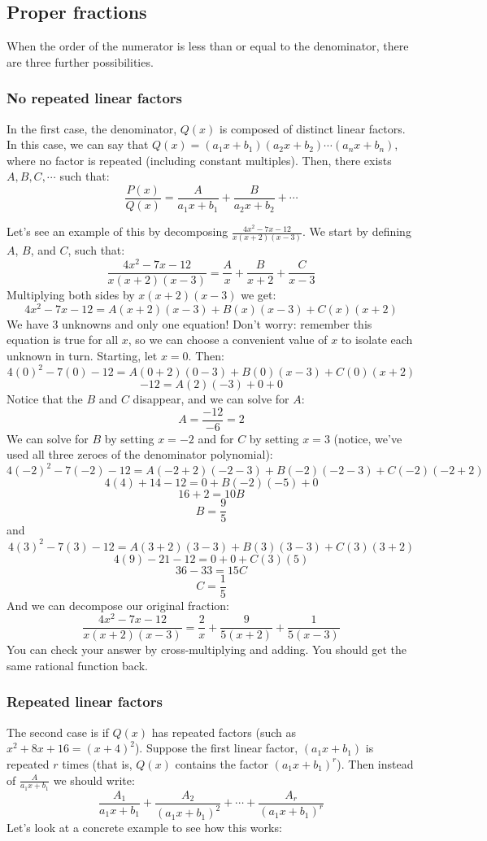 \subsection{Proper fractions}
When the order of the numerator is less than or equal to the denominator, 
there are three further possibilities. 

\subsubsection{No repeated linear factors}
In the first case, the denominator, $Q(x)$ is composed of distinct linear 
factors. In this case, we can say that $Q(x) = (a_1x + b_1)(a_2x + b_2) \cdots 
(a_nx + b_n)$, where no factor is repeated (including constant multiples). 
Then, there exists $A, B, C, \cdots$ such that:
$$\frac{P(x)}{Q(x)} = \frac{A}{a_1x+b_1} + \frac{B}{a_2x + b_2} + \cdots$$

Let's see an example of this by decomposing $\frac{4x^2 - 7x - 12}{x (x + 2) (x 
- 3)}$. We start by defining $A$, $B$, and $C$, such that:
$$\frac{4x^2 - 7x - 12}{x (x + 2) (x - 3)} = \frac{A}{x} + \frac{B}{x + 2} + 
\frac{C}{x - 3}$$
Multiplying both sides by $x (x + 2) (x - 3)$ we get:
$$4x^2 - 7x - 12 = A(x + 2)(x - 3) + B(x)(x - 3) + C(x)(x + 2)$$
We have 3 unknowns and only one equation! Don't worry: remember this equation 
is true for all $x$, so we can choose a convenient value of $x$ to isolate 
each unknown in turn. Starting, let $x = 0$. Then:
$$4(0)^2 - 7(0) - 12 = A(0 + 2)(0 - 3) + B(0)(x - 3) + C(0)(x + 2)$$
$$-12 = A(2)(-3) + 0 + 0$$
Notice that the $B$ and $C$ disappear, and we can solve for $A$:
$$A = \frac{-12}{-6} = 2$$
We can solve for $B$ by setting $x = -2$ and for $C$ by setting $x = 3$ 
(notice, we've used all three zeroes of the denominator polynomial):
$$4(-2)^2 - 7(-2) - 12 = A(-2 + 2)(-2 - 3) + B(-2)(-2 - 3) + C(-2)(-2 + 2)$$
$$4(4) + 14 - 12 = 0 + B(-2)(-5) + 0$$
$$16 + 2 = 10B$$
$$B = \frac{9}{5}$$
and
$$4(3)^2 - 7(3) - 12 = A(3 + 2)(3 - 3) + B(3)(3 - 3) + C(3)(3 + 2)$$
$$4(9) - 21 - 12 = 0 + 0 + C(3)(5)$$
$$36 - 33 = 15C$$
$$C = \frac{1}{5}$$
And we can decompose our original fraction:
$$\frac{4x^2 - 7x - 12}{x (x + 2) (x - 3)} = \frac{2}{x} + \frac{9}{5(x + 2)} 
+ \frac{1}{5(x - 3)}$$
You can check your answer by cross-multiplying and adding. You should get the 
same rational function back. 

\subsubsection{Repeated linear factors}
The second case is if $Q(x)$ has repeated factors (such as $x^2 + 8x + 16 = (x 
+ 4)^2$). Suppose the first linear factor, $(a_1x + b_1)$ is repeated $r$ 
times (that is, $Q(x)$ contains the factor $(a_1x + b_1)^r$). Then instead of 
$\frac{A}{a_1x + b_1}$ we should write:
$$\frac{A_1}{a_1x + b_1} + \frac{A_2}{(a_1x + b_1)^2} + \cdots + \frac{A_r}{(
a_1x + b_1)^r}$$
Let's look at a concrete example to see how this works:

